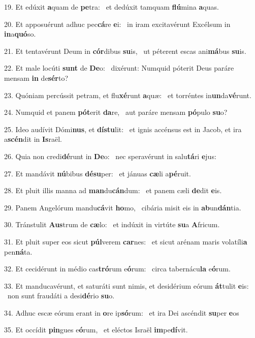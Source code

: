 19. Et edúxit \textbf{a}quam de \textbf{pe}tra: \ast\  et dedúxit tamquam \textbf{flú}mina \textbf{a}quas.\

20. Et apposuérunt adhuc pec\textbf{cá}re \textbf{e}i: \ast\  in iram excitavérunt Excélsum in \textbf{in}a\textbf{quó}so.\

21. Et tentavérunt Deum in \textbf{cór}dibus \textbf{su}is, \ast\  ut péterent escas ani\textbf{má}bus \textbf{su}is.\

22. Et male locúti \textbf{sunt} de \textbf{De}o: \ast\  dixérunt: Numquid póterit Deus paráre mensam \textbf{in} de\textbf{sér}to?\

23. Quóniam percússit petram, et flu\textbf{xé}runt \textbf{a}quæ: \ast\  et torréntes in\textbf{un}da\textbf{vé}runt.\

24. Numquid et panem \textbf{pót}erit \textbf{da}re, \ast\  aut paráre mensam \textbf{pó}pulo \textbf{su}o?\

25. Ideo audívit Dómi\textbf{nus}, et \textbf{dís}\textbf{tu}lit: \ast\  et ignis accénsus est in Jacob, et ira a\textbf{scén}dit in \textbf{Is}raël.\

26. Quia non credi\textbf{dé}runt in \textbf{De}o: \ast\  nec speravérunt in salu\textbf{tá}ri \textbf{e}jus:\

27. Et mandávit \textbf{nú}bibus \textbf{dé}\textbf{su}per: \ast\  et jánuas \textbf{cæ}li a\textbf{pé}ruit.\

28. Et pluit illis manna ad \textbf{man}du\textbf{cán}dum: \ast\  et panem cæli \textbf{de}dit \textbf{e}is.\

29. Panem Angelórum mandu\textbf{cá}vit \textbf{ho}mo, \ast\  cibária misit eis in \textbf{ab}un\textbf{dán}tia.\

30. Tránstulit \textbf{Aus}trum de \textbf{cæ}lo: \ast\  et indúxit in virtúte \textbf{su}a \textbf{A}fricum.\

31. Et pluit super eos sicut \textbf{púl}verem \textbf{car}nes: \ast\  et sicut arénam maris volatíli\textbf{a} pen\textbf{ná}ta.\

32. Et cecidérunt in médio cas\textbf{tró}rum e\textbf{ó}rum: \ast\  circa tabernácu\textbf{la} e\textbf{ó}rum.\

33. Et manducavérunt, et saturáti sunt nimis, et desidérium eórum \textbf{át}tulit \textbf{e}is: \ast\  non sunt fraudáti a desi\textbf{dé}rio \textbf{su}o.\

34. Adhuc escæ eórum erant in \textbf{o}re ip\textbf{só}rum: \ast\  et ira Dei ascéndit \textbf{su}per \textbf{e}os\

35. Et occídit \textbf{pin}gues e\textbf{ó}rum, \ast\  et eléctos Israël \textbf{im}pe\textbf{dí}vit.\

